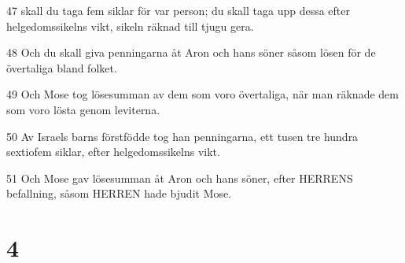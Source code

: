 \par 47 skall du taga fem siklar för var person; du skall taga upp dessa efter helgedomssikelns vikt, sikeln räknad till tjugu gera.
\par 48 Och du skall giva penningarna åt Aron och hans söner såsom lösen för de övertaliga bland folket.
\par 49 Och Mose tog lösesumman av dem som voro övertaliga, när man räknade dem som voro lösta genom leviterna.
\par 50 Av Israels barns förstfödde tog han penningarna, ett tusen tre hundra sextiofem siklar, efter helgedomssikelns vikt.
\par 51 Och Mose gav lösesumman åt Aron och hans söner, efter HERRENS befallning, såsom HERREN hade bjudit Mose.

\chapter{4}

